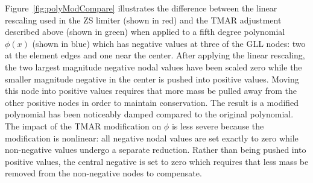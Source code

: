 \documentclass{ametsoc}
\begin{document}
Figure~\ref{fig:polyModCompare} illustrates the difference between the linear rescaling used in the ZS limiter (shown in red) and the TMAR adjustment described above (shown in green) when applied to a fifth degree polynomial $\phi(x)$ (shown in blue) which has negative values at three of the GLL nodes: two at the element edges and one near the center. After applying the linear rescaling, the two largest magnitude negative nodal values have been scaled zero while the smaller magnitude negative in the center is pushed into positive values. Moving this node into positive values requires that more mass be pulled away from the other positive nodes in order to maintain conservation. The result is a modified polynomial has been noticeably damped compared to the original polynomial. The impact of the TMAR modification on $\phi$ is less severe because the modification is nonlinear: all negative nodal values are set exactly to zero while non-negative values undergo a separate reduction. Rather than being pushed into positive values, the central negative is set to zero which requires that less mass be removed from the non-negative nodes to compensate.
\end{document}
